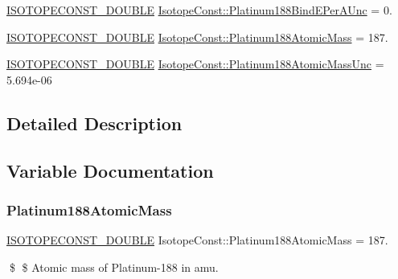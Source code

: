 \begin{DoxyCompactItemize}
\mbox{\hyperlink{group___isotope_const-_macros_ga8f45a7272ce02c0b4c65c44636ed719a}{I\+S\+O\+T\+O\+P\+E\+C\+O\+N\+S\+T\+\_\+\+D\+O\+U\+B\+LE}} \mbox{\hyperlink{group___isotope_const-_platinum-_pt188_ga126b8e61629eaa0161bb39301400679e}{Isotope\+Const\+::\+Platinum188\+Bind\+E\+Per\+A\+Unc}} = 0.
\item 
\mbox{\hyperlink{group___isotope_const-_macros_ga8f45a7272ce02c0b4c65c44636ed719a}{I\+S\+O\+T\+O\+P\+E\+C\+O\+N\+S\+T\+\_\+\+D\+O\+U\+B\+LE}} \mbox{\hyperlink{group___isotope_const-_platinum-_pt188_gafdc8abf86b93747bb1b806611f31ee42}{Isotope\+Const\+::\+Platinum188\+Atomic\+Mass}} = 187.
\item 
\mbox{\hyperlink{group___isotope_const-_macros_ga8f45a7272ce02c0b4c65c44636ed719a}{I\+S\+O\+T\+O\+P\+E\+C\+O\+N\+S\+T\+\_\+\+D\+O\+U\+B\+LE}} \mbox{\hyperlink{group___isotope_const-_platinum-_pt188_ga7661a1393da494fca6a8a2f8497c6469}{Isotope\+Const\+::\+Platinum188\+Atomic\+Mass\+Unc}} = 5.\+694e-\/06
\end{DoxyCompactItemize}


\subsection{Detailed Description}


\subsection{Variable Documentation}
\mbox{\label{group___isotope_const-_platinum-_pt188_gafdc8abf86b93747bb1b806611f31ee42}} 
\subsubsection{\texorpdfstring{Platinum188\+Atomic\+Mass}{Platinum188AtomicMass}}
{\footnotesize\ttfamily \mbox{\hyperlink{group___isotope_const-_macros_ga8f45a7272ce02c0b4c65c44636ed719a}{I\+S\+O\+T\+O\+P\+E\+C\+O\+N\+S\+T\+\_\+\+D\+O\+U\+B\+LE}} Isotope\+Const\+::\+Platinum188\+Atomic\+Mass = 187.}

\$ \$ Atomic mass of Platinum-\/188 in amu. \mbox{\label{group___isotope_const-_platinum-_pt188_ga7661a1393da494fca6a8a2f8497c6469}} 
